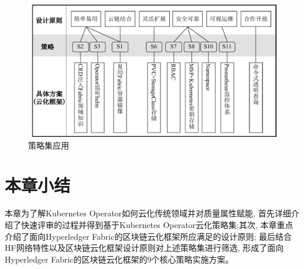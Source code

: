 \begin{figure}[h] %
    \centering %
    \includegraphics[width=1.0\textwidth]{FIGs/chapter3/policy_characteristics.pdf} %
    \caption{策略集应用} %
    \label{policy_set_application} %
\end{figure}%


\section{本章小结}

本章为了解Kubernetes Operator如何云化传统领域并对质量属性赋能, 首先详细介绍了快速评审的过程并得到基于Kubernetes Operator云化策略集;其次, 本章重点介绍了面向Hyperledger Fabric的区块链云化框架所应满足的设计原则; 最后结合HF网络特性以及区块链云化框架设计原则对上述策略集进行筛选, 形成了面向Hyperledger Fabric的区块链云化框架的9个核心策略实施方案。